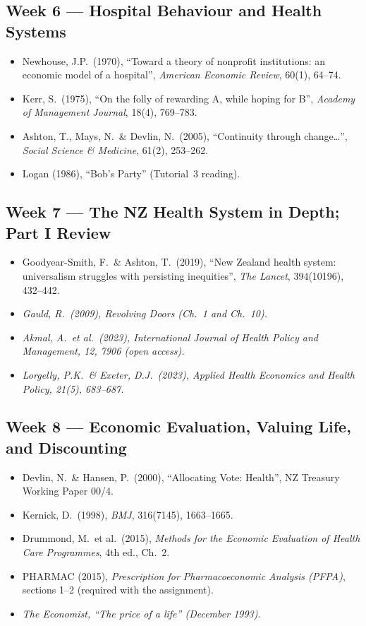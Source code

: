 \documentclass[11pt, a4paper]{article}
\begin{document}
\subsection{Week 6 — Hospital Behaviour and Health Systems}
\begin{itemize}
  \item Newhouse, J.P.\ (1970), ``Toward a theory of nonprofit institutions: an economic model of a hospital'', \textit{American Economic Review}, 60(1), 64--74.
  \item Kerr, S.\ (1975), ``On the folly of rewarding A, while hoping for B'', \textit{Academy of Management Journal}, 18(4), 769--783.
  \item Ashton, T., Mays, N.\ \& Devlin, N.\ (2005), ``Continuity through change…'', \textit{Social Science \& Medicine}, 61(2), 253--262.
  \item Logan (1986), ``Bob's Party'' (Tutorial~3 reading).
\end{itemize}

\subsection{Week 7 — The NZ Health System in Depth; Part I Review}
\begin{itemize}
  \item Goodyear-Smith, F.\ \& Ashton, T.\ (2019), ``New Zealand health system: universalism struggles with persisting inequities'', \textit{The Lancet}, 394(10196), 432--442.
  \item \emph{Gauld, R.\ (2009), \textit{Revolving Doors} (Ch.~1 and Ch.~10).}
  \item \emph{Akmal, A.\ et al.\ (2023), \textit{International Journal of Health Policy and Management}, 12, 7906 (open access).}
  \item \emph{Lorgelly, P.K.\ \& Exeter, D.J.\ (2023), \textit{Applied Health Economics and Health Policy}, 21(5), 683--687.}
\end{itemize}

\subsection{Week 8 — Economic Evaluation, Valuing Life, and Discounting}
\begin{itemize}
  \item Devlin, N.\ \& Hansen, P.\ (2000), ``Allocating Vote: Health'', NZ Treasury Working Paper 00/4.
  \item Kernick, D.\ (1998), \textit{BMJ}, 316(7145), 1663--1665.
  \item Drummond, M.\ et al.\ (2015), \textit{Methods for the Economic Evaluation of Health Care Programmes}, 4th ed., Ch.~2.
  \item PHARMAC (2015), \textit{Prescription for Pharmacoeconomic Analysis (PFPA)}, sections 1--2 (required with the assignment).
  \item \emph{The Economist, ``The price of a life'' (December 1993).}
\end{itemize}
\end{document}

